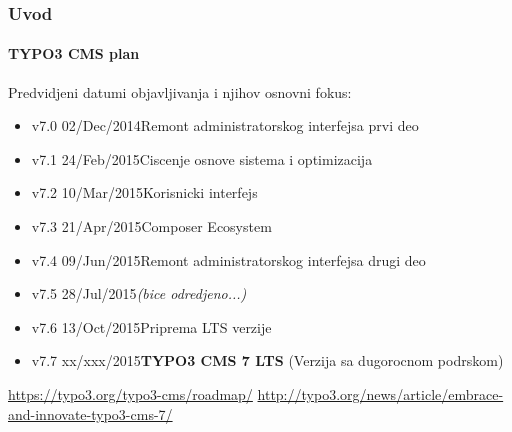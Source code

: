 
\begin{frame}[fragile]
	\frametitle{Uvod}
	\framesubtitle{TYPO3 CMS plan}

	Predvidjeni datumi objavljivanja i njihov osnovni fokus:

	\begin{itemize}
		\item v7.0 \textrightarrow\tabto{1.3cm}02/Dec/2014\tabto{3.4cm}Remont administratorskog interfejsa prvi deo

		\item
			\begingroup
				\color{typo3orange}
					v7.1 \textrightarrow\tabto{1.3cm}24/Feb/2015\tabto{3.4cm}Ciscenje osnove sistema i optimizacija
			\endgroup

		\item v7.2 \textrightarrow\tabto{1.3cm}10/Mar/2015\tabto{3.4cm}Korisnicki interfejs
		\item v7.3 \textrightarrow\tabto{1.3cm}21/Apr/2015\tabto{3.4cm}Composer Ecosystem
		\item v7.4 \textrightarrow\tabto{1.3cm}09/Jun/2015\tabto{3.4cm}Remont administratorskog interfejsa drugi deo
		\item v7.5 \textrightarrow\tabto{1.3cm}28/Jul/2015\tabto{3.4cm}\textit{(bice odredjeno...)}
		\item v7.6 \textrightarrow\tabto{1.3cm}13/Oct/2015\tabto{3.4cm}Priprema LTS verzije
		\item v7.7 \textrightarrow\tabto{1.3cm}xx/xxx/2015\tabto{3.4cm}\textbf{TYPO3 CMS 7 LTS} (Verzija sa dugorocnom podrskom)
	\end{itemize}

	\smaller
		\url{https://typo3.org/typo3-cms/roadmap/}\newline
		\url{http://typo3.org/news/article/embrace-and-innovate-typo3-cms-7/}
	\normalsize

\end{frame}


